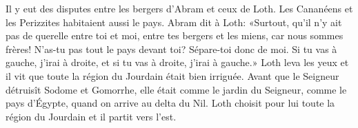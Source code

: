 Il y eut des disputes entre les bergers d’Abram et ceux de Loth.
	Les Cananéens et les Perizzites habitaient aussi le pays.
Abram dit à Loth:
	«Surtout, qu’il n’y ait pas de querelle entre toi et moi,
	entre tes bergers et les miens, car nous sommes frères!
N’as-tu pas tout le pays devant toi? Sépare-toi donc de moi.
	Si tu vas à gauche, j’irai à droite, et si tu vas à droite, j’irai à gauche.»
Loth leva les yeux et il vit que toute la région du Jourdain était bien irriguée.
Avant que le Seigneur détruisît Sodome et Gomorrhe,
	elle était comme le jardin du Seigneur,
	comme le pays d’Égypte, quand on arrive au delta du Nil.
Loth choisit pour lui toute la région du Jourdain et il partit vers l’est.
